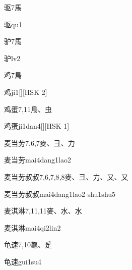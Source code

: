 \begin{entry}{驱}{7}{⾺}
  \begin{phonetics}{驱}{qu1}
  \end{phonetics}
\end{entry}

\begin{entry}{驴}{7}{⾺}
  \begin{phonetics}{驴}{lv2}
  \end{phonetics}
\end{entry}

\begin{entry}{鸡}{7}{⿃}
  \begin{phonetics}{鸡}{ji1}[][HSK 2]
  \end{phonetics}
\end{entry}

\begin{entry}{鸡蛋}{7,11}{⿃、⾍}
  \begin{phonetics}{鸡蛋}{ji1dan4}[][HSK 1]
  \end{phonetics}
\end{entry}

\begin{entry}{麦当劳}{7,6,7}{⿆、⼹、⼒}
  \begin{phonetics}{麦当劳}{mai4dang1lao2}
  \end{phonetics}
\end{entry}

\begin{entry}{麦当劳叔叔}{7,6,7,8,8}{⿆、⼹、⼒、⼜、⼜}
  \begin{phonetics}{麦当劳叔叔}{mai4dang1lao2 shu1shu5}
  \end{phonetics}
\end{entry}

\begin{entry}{麦淇淋}{7,11,11}{⿆、⽔、⽔}
  \begin{phonetics}{麦淇淋}{mai4qi2lin2}
  \end{phonetics}
\end{entry}

\begin{entry}{龟速}{7,10}{⿔、⾡}
  \begin{phonetics}{龟速}{gui1su4}
  \end{phonetics}
\end{entry}


